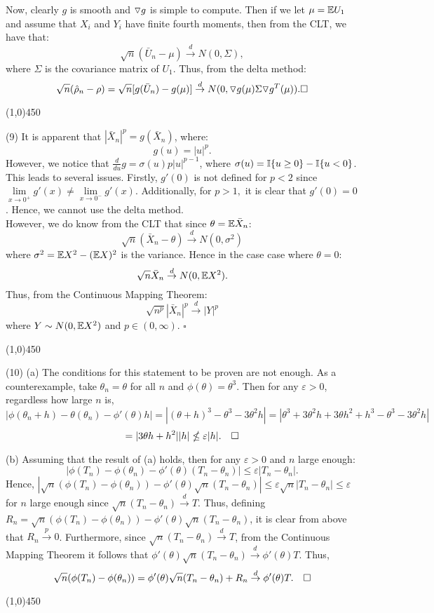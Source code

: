 \documentclass[12pt]{article}
\begin{document}
\noindent
Now, clearly $g$ is smooth and $\triangledown g$ is simple to compute. Then if we let $\mu = \mathbb{E} U_1$ and assume that $X_i$ and $Y_i$ have finite fourth moments, then from the CLT, we have that:
$$\sqrt{n}(\bar{U}_n-\mu) \overset{d}\to N(0,\Sigma),$$
where $\Sigma$ is the covariance matrix of $U_1$. Thus, from the delta method: 
$$\sqrt{n}(\hat{\rho}_n-\rho) = \sqrt{n} [g(\bar{U}_n)-g(\mu)] \overset{d}\to N(0,\triangledown g(\mu) \Sigma \triangledown g^T(\mu)). \square$$
\begin{center}
\line(1,0){450}
\end{center}

\noindent
(9) It is apparent that $|\bar{X}_n|^p = g(\bar{X}_n)$, where:
$$ g(u) = |u|^p.$$
However, we notice that $\frac{d}{du}g = \sigma(u)p|u|^{p-1}$, where $\sigma(u) = \mathbb{I}\{u\geq 0\}-\mathbb{I}\{u<0\}$. This leads to several issues. Firstly, $g'(0)$ is not defined for $p<2$ since $\lim\limits_{x\to0^+} g'(x) \neq \lim\limits_{x\to0^-}g'(x)$. Additionally, for $p>1,$ it is clear that $g'(0) =0$. Hence, we cannot use the delta method.\\

\noindent
However, we do know from the CLT that since $\theta = \mathbb{E} \bar{X}_n$:
$$ \sqrt{n}(\bar{X}_n-\theta) \overset{d}\to N(0,\sigma^2)$$
where $\sigma^2 = \mathbb{E} X^2-(\mathbb{E} X)^2$ is the variance. Hence in the case case where $\theta = 0$:
$$ \sqrt{n}\bar{X}_n \overset{d}\to N(0,\mathbb{E} X^2).$$
Thus, from the Continuous Mapping Theorem:
$$ \sqrt{n^p} |\bar{X}_n|^p \overset{d}\to |Y|^p$$
where $Y \sim N(0,\mathbb{E} X^2)$ and $p \in (0,\infty)$.  $\square$
\begin{center}
\line(1,0){450}
\end{center}

\pagebreak
\noindent
(10) (a) The conditions for this statement to be proven are not enough. As a counterexample, take $\theta_n = \theta$ for all $n$ and $\phi(\theta) = \theta^3$. Then for any $\varepsilon>0$, regardless how large $n$ is,
$$|\phi(\theta_n+h)-\theta(\theta_n)-\phi'(\theta)h| = |(\theta+h)^3-\theta^3-3\theta^2h|
= |\theta^3+3\theta^2h+3\theta h^2+h^3-\theta^3-3\theta^2h|$$
$$= |3\theta h+h^2| |h| \nleq \varepsilon |h|. \hspace{10 pt} \square$$

\noindent
(b) Assuming that the result of (a) holds, then for any $\varepsilon>0$ and $n$ large enough: $$|\phi(T_n)-\phi(\theta_n)-\phi'(\theta)(T_n-\theta_n)| \leq \varepsilon |T_n-\theta_n|.$$ Hence, $|\sqrt{n}(\phi(T_n)-\phi(\theta_n))-\phi'(\theta)\sqrt{n}(T_n-\theta_n)| \leq \varepsilon \sqrt{n} |T_n-\theta_n| \leq \varepsilon$ for $n$ large enough since $\sqrt{n}(T_n-\theta_n) \overset{d}\to T$. Thus, defining $R_n = \sqrt{n}(\phi(T_n)-\phi(\theta_n))-\phi'(\theta)\sqrt{n}(T_n-\theta_n)$, it is clear from above that $R_n \overset{p}\to 0$. Furthermore, since $\sqrt{n}(T_n-\theta_n) \overset{d}\to T$, from the Continuous Mapping Theorem it follows that $\phi'(\theta)\sqrt{n}(T_n-\theta_n) \overset{d}\to \phi'(\theta)T$. Thus, 
$$\sqrt{n}(\phi(T_n)-\phi(\theta_n)) = \phi'(\theta)\sqrt{n}(T_n-\theta_n)+R_n \overset{d}\to \phi'(\theta)T. \hspace{10 pt} \square $$
\begin{center}
\line(1,0){450}
\end{center}
\end{document}
